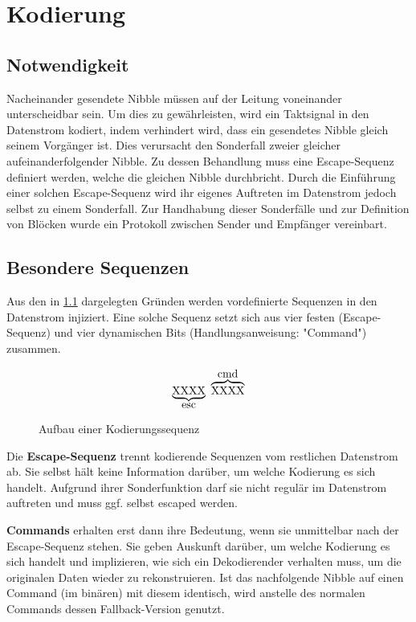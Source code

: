 \chapter{Kodierung}
\section{Notwendigkeit}
\label{sec:notwendigkeit}
Nacheinander gesendete Nibble müssen auf der Leitung voneinander unterscheidbar sein. Um dies zu gewährleisten, wird ein Taktsignal in den Datenstrom kodiert, indem verhindert wird, dass ein gesendetes Nibble gleich seinem Vorgänger ist. Dies verursacht den Sonderfall zweier gleicher aufeinanderfolgender Nibble. Zu dessen Behandlung muss eine Escape-Sequenz definiert werden, welche die gleichen Nibble durchbricht. Durch die Einführung einer solchen Escape-Sequenz wird ihr eigenes Auftreten im Datenstrom jedoch selbst zu einem Sonderfall. Zur Handhabung dieser Sonderfälle und zur Definition von Blöcken wurde ein Protokoll zwischen Sender und Empfänger vereinbart.

\section{Besondere Sequenzen}
Aus den in \ref{sec:notwendigkeit} dargelegten Gründen werden vordefinierte Sequenzen in den Datenstrom injiziert. Eine solche Sequenz setzt sich aus vier festen (Escape-Sequenz) und vier dynamischen Bits (Handlungsanweisung: "Command") zusammen.

\begin{figure}[H]
    \centering
    \[
        \underbrace{\text{XXXX}}_\text{\normalsize esc} \ \overbrace{\text{XXXX}}^\text{\normalsize cmd}
    \]
    \caption{Aufbau einer Kodierungssequenz}
\end{figure}

Die \textbf{Escape-Sequenz} trennt kodierende Sequenzen vom restlichen Datenstrom ab. Sie selbst hält keine Information darüber, um welche Kodierung es sich handelt. Aufgrund ihrer Sonderfunktion darf sie nicht regulär im Datenstrom auftreten und muss ggf. selbst escaped werden.

\textbf{Commands} erhalten erst dann ihre Bedeutung, wenn sie unmittelbar nach der Escape-Sequenz stehen. Sie geben Auskunft darüber, um welche Kodierung es sich handelt und implizieren, wie sich ein Dekodierender verhalten muss, um die originalen Daten wieder zu rekonstruieren. Ist das nachfolgende Nibble auf einen Command (im binären) mit diesem identisch, wird anstelle des normalen Commands dessen Fallback-Version genutzt.

